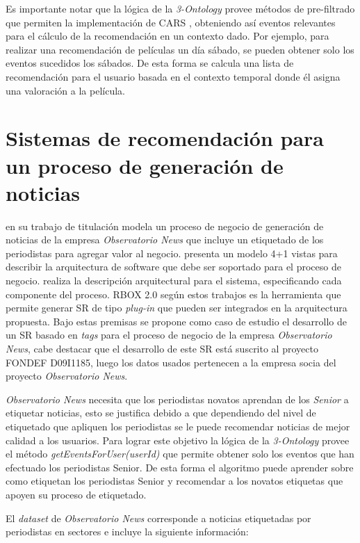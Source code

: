 Es importante notar que la lógica de la \textit{3-Ontology} provee métodos de pre-filtrado que permiten la implementación de CARS \citep{Adomavicius:2011}, obteniendo así eventos relevantes para el cálculo de la recomendación en un contexto dado. Por ejemplo, para realizar una recomendación de películas un día sábado, se pueden obtener solo los eventos sucedidos los sábados. De esta forma se calcula una lista de recomendación para el usuario basada en el contexto temporal donde él asigna una valoración a la película.


\section{Sistemas de recomendación para un proceso de generación de noticias}

\cite{Alonso:2012} en su trabajo de titulación modela un proceso de negocio de generación de noticias de la empresa \textit{Observatorio News} que incluye un etiquetado de los periodistas para agregar valor al negocio. \cite{Rivera:2012} presenta un modelo 4+1 vistas para describir la arquitectura de software que debe ser soportado para el proceso de negocio. \cite{Mendez:2013} realiza la descripción arquitectural para el sistema, especificando cada componente del proceso. RBOX 2.0 según estos trabajos es la herramienta que permite generar SR de tipo \textit{plug-in} que pueden ser integrados en la arquitectura propuesta. Bajo estas premisas se propone como caso de estudio el desarrollo de un SR basado en \textit{tags} para el proceso de negocio de la empresa \textit{Observatorio News}, cabe destacar que el desarrollo de este SR está suscrito al proyecto FONDEF D09I1185, luego los datos usados pertenecen a la empresa socia del proyecto \textit{Observatorio News}.

\textit{Observatorio News} necesita que los periodistas novatos aprendan de los \textit{Senior} a etiquetar noticias, esto se justifica debido a que dependiendo del nivel de etiquetado que apliquen los periodistas se le puede recomendar noticias de mejor calidad a los usuarios. Para lograr este objetivo la lógica de la \textit{3-Ontology} provee el método \textit{getEventsForUser(userId)} que permite obtener solo los eventos que han efectuado los periodistas Senior. De esta forma el algoritmo puede aprender sobre como etiquetan los periodistas Senior y recomendar a los novatos etiquetas que apoyen su proceso de etiquetado.

El \textit{dataset} de \textit{Observatorio News} corresponde a noticias etiquetadas por periodistas en sectores e incluye la siguiente información:

